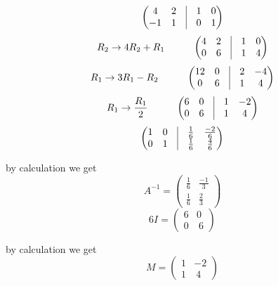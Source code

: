 \documentclass[journal,12pt,twocolumn]{IEEEtran}
\newcommand{\myvec}[1]{\ensuremath{\begin{pmatrix}#1\end{pmatrix}}}
\begin{document}
    
    
   	\begin{equation}	
   		\myvec{4 &2 & \vrule &1&0\\ -1&1&\vrule&0&1}
	\end{equation} 
	\begin{equation}
	    		R_2\rightarrow 4R_2+R_1 \hspace{10mm}  \myvec{4 &2 & \vrule 					&1&0\\ 0&6&\vrule&1&4}
	\end{equation}
	\begin{equation}
		R_1\rightarrow 3R_1-R_2 \hspace{10mm}  \myvec{12 &0 & \vrule 					&2&-4\\ 0&6&\vrule&1&4}
\end{equation}
\begin{equation}
		R_1\rightarrow \frac{R_1}{2} \hspace{10mm}  \myvec{6 &0 & \vrule 					&1&-2\\ 0&6&\vrule&1&4}
\end{equation}
\begin{equation}
		  \myvec{1 &0 & \vrule&\frac{1}{6}&\frac{-2}{6}\\ 0&1&\vrule&\frac{1}{6}&\frac{4}{6}}
\end{equation}		       
   
 by calculation we get   
 \begin{equation}
  A^{-1}=\myvec{
      \frac{1}{6} & \frac{-1}{3}\\
    \frac{1}{6} & \frac{2}{3}
     }
  \end{equation}
  \begin{equation}
 6I=\myvec{
    6&0 \\
    0 & \ 6
     }
       \end{equation}
       
 by calculation we get 
 \begin{equation}
 M=\myvec{
    1&-2 \\
    1 & \ 4
     }
     \end{equation}
     
     
\end{document}
